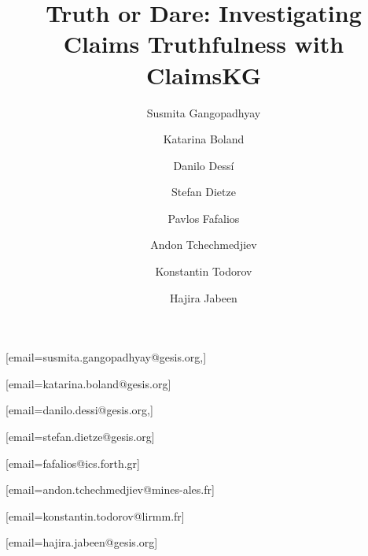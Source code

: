 \documentclass[
]{ceurart}
\begin{document}



\title{Truth or Dare: Investigating Claims Truthfulness with ClaimsKG}



\address[1]{%
KTS Department, GESIS – Leibniz Institute for the Social Sciences, Cologne, Germany}
\address[2]{Heinrich-Heine-University Dusseldorf, Dusseldorf, Germany}
\address[3]{Institute of Computer Science, FORTH-ICS, Greece}
\address[4]{EuroMov Digital Health in Motion, Univ. Montpellier, IMT Mines Alès, Alès, France}
\address[5]{LIRMM / University of Montpellier / CNRS, France}

\author[1]{Susmita Gangopadhyay}[email=susmita.gangopadhyay@gesis.org,]
\author[1]{Katarina Boland}[email=katarina.boland@gesis.org]
\author[1]{Danilo Dess{\'i}}[email=danilo.dessi@gesis.org,]
\author[1,2]{Stefan Dietze}[email=stefan.dietze@gesis.org]
\author[3]{Pavlos Fafalios}[email=fafalios@ics.forth.gr]
\author[4]{Andon Tchechmedjiev}[email=andon.tchechmedjiev@mines-ales.fr]
\author[5]{Konstantin Todorov}[email=konstantin.todorov@lirmm.fr]
\author[1]{Hajira Jabeen}[email=hajira.jabeen@gesis.org]

\end{document}
